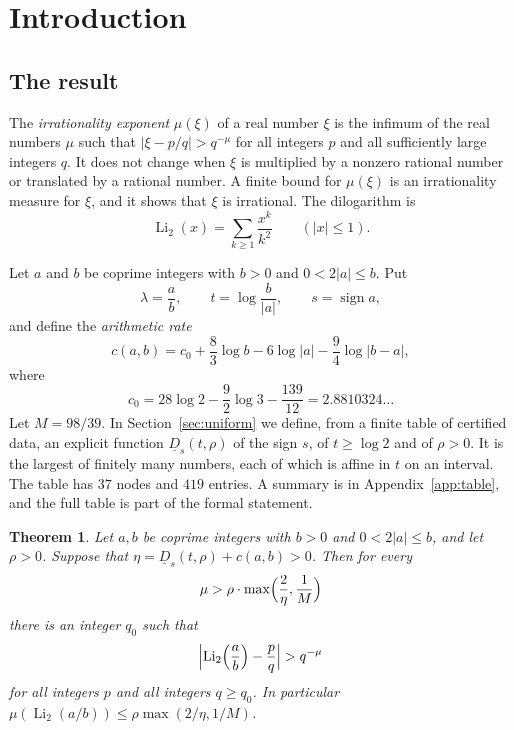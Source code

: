\documentclass[11pt]{amsart}
\newtheorem{theorem}{Theorem}[section]
\theoremstyle{definition}
\theoremstyle{remark}
\numberwithin{equation}{section}
\newcommand{\Li}{\operatorname{Li}}
\newcommand{\Dlow}{\underline{D}}
\begin{document}
\maketitle
\tableofcontents

\section{Introduction}\label{sec:intro}

\subsection{The result}
The \emph{irrationality exponent} $\mu(\xi)$ of a real number $\xi$ is the infimum of the real numbers $\mu$ such that
$|\xi-p/q|>q^{-\mu}$ for all integers $p$ and all sufficiently large integers $q$. It does not change when $\xi$ is
multiplied by a nonzero rational number or translated by a rational number. A finite bound for $\mu(\xi)$ is an
irrationality measure for $\xi$, and it shows that $\xi$ is irrational. The dilogarithm is
\[
 \Li_2(x)=\sum_{k\ge1}\frac{x^k}{k^2}\qquad(|x|\le1).
\]

Let $a$ and $b$ be coprime integers with $b>0$ and $0<2|a|\le b$. Put
\[
 \lambda=\frac ab,\qquad t=\log\frac b{|a|},\qquad s=\operatorname{sign}a,
\]
and define the \emph{arithmetic rate}
\begin{equation}\label{eq:crate}
 c(a,b)=c_0+\frac83\log b-6\log|a|-\frac94\log|b-a|,
\end{equation}
where
\begin{equation}\label{eq:c0}
 c_0=28\log2-\frac92\log3-\frac{139}{12}=2.8810324\ldots
\end{equation}
Let $M=98/39$. In Section~\ref{sec:uniform} we define, from a finite table of certified data, an explicit function
$\Dlow_s(t,\rho)$ of the sign $s$, of $t\ge\log2$ and of $\rho>0$. It is the largest of finitely many numbers, each
of which is affine in $t$ on an interval. The table has $37$ nodes and $419$ entries. A summary is in
Appendix~\ref{app:table}, and the full table is part of the formal statement.

\begin{theorem}\label{thm:main}
Let $a,b$ be coprime integers with $b>0$ and $0<2|a|\le b$, and let $\rho>0$. Suppose that
$\eta=\Dlow_s(t,\rho)+c(a,b)>0$. Then for every
\[
 \mu>\rho\cdot\max\Bigl(\frac2\eta,\frac1M\Bigr)
\]
there is an integer $q_0$ such that
\[
 \Bigl|\Li_2\Bigl(\frac ab\Bigr)-\frac pq\Bigr|>q^{-\mu}
\]
for all integers $p$ and all integers $q\ge q_0$. In particular $\mu(\Li_2(a/b))\le\rho\max(2/\eta,1/M)$.
\end{theorem}
\end{document}

